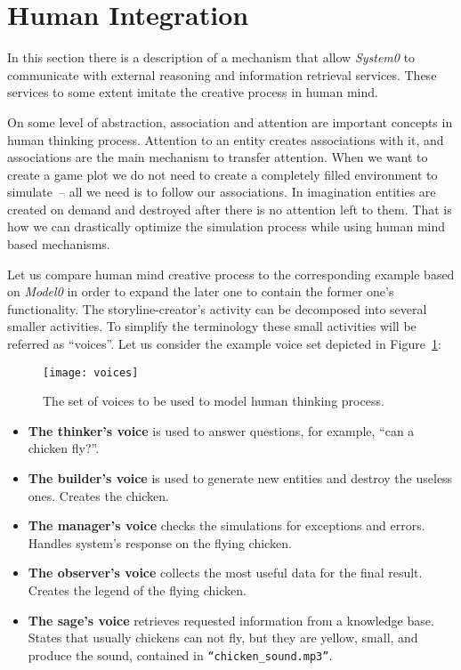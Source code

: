 \section{Human Integration}
In this section  there is a description of a mechanism that allow \textit{System0} to communicate with external reasoning and information retrieval services. These services to some extent imitate the creative process in human mind.\par
On some level of abstraction, association and attention are important concepts in human thinking process. Attention to an entity creates associations with it, and associations are the main mechanism to transfer attention. When we want to create a game plot we do not need to create a completely filled environment to simulate~-- all we need is to follow our associations. In imagination entities are created on demand and destroyed after there is no attention left to them. That is how we can drastically optimize the simulation process while using human mind based mechanisms.\par
Let us compare human mind creative process to the corresponding example based on \textit{Model0} in order to expand the later one to contain the former one's functionality.
The storyline-creator's activity can be decomposed into several smaller activities. To simplify the terminology these small activities will be referred as ``voices''. Let us consider the example voice set depicted in Figure~\ref{Voices}:
 \begin{figure}[h!]
    \begin{center}
      \texttt{[image: voices]}
      \caption{The set of voices to be used to model human thinking process.}
      \label{Voices}
     \end{center}
    \end{figure}
\begin{itemize}
\item \textbf{The thinker's voice} is used to answer questions, for example, ``can a chicken fly?''.
\item \textbf{The builder's voice} is used to generate new entities and destroy the useless ones. Creates the chicken.
\item \textbf{The manager's voice} checks the simulations for exceptions and errors. Handles system's response on the flying chicken.
\item \textbf{The observer's voice} collects the most useful data for the final result. Creates the legend of the flying chicken.
\item \textbf{The sage's voice} retrieves requested information from a knowledge base. States that usually chickens can not fly, but they are yellow, small, and produce the sound, contained in \texttt{``chicken\_sound.mp3''}.
\end{itemize}

